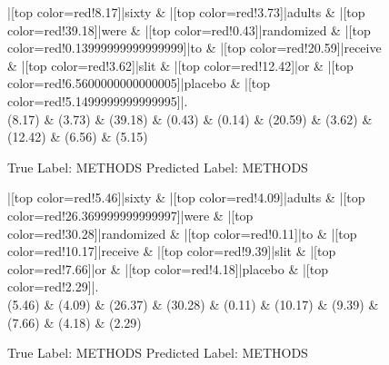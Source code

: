 \documentclass[a4paper, landscape]{article}
\begin{document}
\begin{figure}
\begin{center}
\begin{dependency}
\begin{deptext}
|[top color=red!8.17]|sixty \& |[top color=red!3.73]|adults \& |[top color=red!39.18]|were \& |[top color=red!0.43]|randomized \& |[top color=red!0.13999999999999999]|to \& |[top color=red!20.59]|receive \& |[top color=red!3.62]|slit \& |[top color=red!12.42]|or \& |[top color=red!6.5600000000000005]|placebo \& |[top color=red!5.1499999999999995]|.\\
(8.17) \& (3.73) \& (39.18) \& (0.43) \& (0.14) \& (20.59) \& (3.62) \& (12.42) \& (6.56) \& (5.15)\\
\end{deptext}
\end{dependency}
\end{center}
\caption{True Label: METHODS Predicted Label: METHODS}
\end{figure}
\clearpage
\begin{figure}
\begin{center}
\begin{dependency}
\begin{deptext}
|[top color=red!5.46]|sixty \& |[top color=red!4.09]|adults \& |[top color=red!26.369999999999997]|were \& |[top color=red!30.28]|randomized \& |[top color=red!0.11]|to \& |[top color=red!10.17]|receive \& |[top color=red!9.39]|slit \& |[top color=red!7.66]|or \& |[top color=red!4.18]|placebo \& |[top color=red!2.29]|.\\
(5.46) \& (4.09) \& (26.37) \& (30.28) \& (0.11) \& (10.17) \& (9.39) \& (7.66) \& (4.18) \& (2.29)\\
\end{deptext}
\end{dependency}
\end{center}
\caption{True Label: METHODS Predicted Label: METHODS}
\end{figure}
\end{document}
